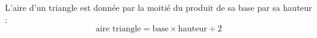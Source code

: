 L'aire d'un triangle est donnée par la moitié du produit de sa base par sa hauteur :
$$\text{aire triangle}=\text{base}\times\text{hauteur}\div 2$$